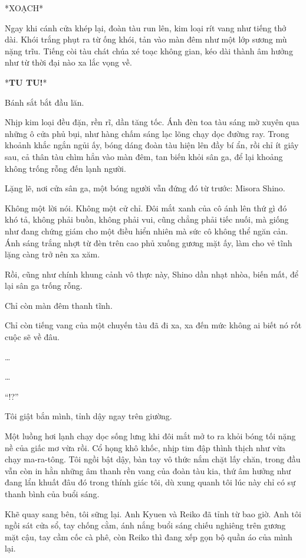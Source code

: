 \documentclass[../main.tex]{subfiles}
\begin{document}

*XOẠCH*

Ngay khi cánh cửa khép lại, đoàn tàu run lên, kim loại rít vang như tiếng thở dài. Khói trắng phụt ra từ ống khói, tản vào màn đêm như một lớp sương mù nặng trĩu. Tiếng còi tàu chát chúa xé toạc không gian, kéo dài thành âm hưởng như từ thời đại nào xa lắc vọng về.

*\textbf{TU TU!}*

Bánh sắt bắt đầu lăn.

Nhịp kim loại đều đặn, rền rĩ, dần tăng tốc. Ánh đèn toa tàu sáng mờ xuyên qua những ô cửa phủ bụi, như hàng chấm sáng lạc lõng chạy dọc đường ray. Trong khoảnh khắc ngắn ngủi ấy, bóng dáng đoàn tàu hiện lên đầy bí ẩn, rồi chỉ ít giây sau, cả thân tàu chìm hẳn vào màn đêm, tan biến khỏi sân ga, để lại khoảng không trống rỗng đến lạnh người.

Lặng lẽ, nơi cửa sân ga, một bóng người vẫn đứng đó từ trước: Misora Shino.

Không một lời nói. Không một cử chỉ. Đôi mắt xanh của cô ánh lên thứ gì đó khó tả, không phải buồn, không phải vui, cũng chẳng phải tiếc nuối, mà giống như đang chứng giám cho một điều hiển nhiên mà sức cô không thể ngăn cản. Ánh sáng trắng nhợt từ đèn trên cao phủ xuống gương mặt ấy, làm cho vẻ tĩnh lặng càng trở nên xa xăm.

Rồi, cũng như chính khung cảnh vô thực này, Shino dần nhạt nhòa, biến mất, để lại sân ga trống rỗng.

Chỉ còn màn đêm thanh tĩnh.

Chỉ còn tiếng vang của một chuyến tàu đã đi xa, xa đến mức không ai biết nó rốt cuộc sẽ về đâu.


\dots

\dots

``!?''

Tôi giật bắn mình, tỉnh dậy ngay trên giường.

Một luồng hơi lạnh chạy dọc sống lưng khi đôi mắt mở to ra khỏi bóng tối nặng nề của giấc mơ vừa rồi. Cổ họng khô khốc, nhịp tim đập thình thịch như vừa chạy ma-ra-tông. Tôi ngồi bật dậy, bàn tay vô thức nắm chặt lấy chăn, trong đầu vẫn còn in hằn những âm thanh rền vang của đoàn tàu kia, thứ âm hưởng như đang lẩn khuất đâu đó trong thính giác tôi, dù xung quanh tôi lúc này chỉ có sự thanh bình của buổi sáng.

Khẽ quay sang bên, tôi sững lại. Anh Kyuen và Reiko đã tỉnh từ bao giờ. Anh tôi ngồi sát cửa sổ, tay chống cằm, ánh nắng buổi sáng chiếu nghiêng trên gương mặt cậu, tay cầm cốc cà phê, còn Reiko thì đang xếp gọn bộ quần áo của mình lại.
\end{document}

